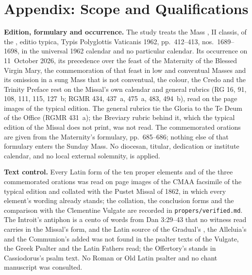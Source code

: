 \section{Appendix: Scope and Qualifications}
\label{sec:scope}

{\small
\textbf{Edition, formulary and occurrence.} The study treats the Mass
, II classis, of the , editio typica, Typis Polyglottis Vaticanis 1962, pp.~412--413,
nos.~1689--1698, in the universal 1962 calendar and no particular calendar. Its
occurrence on 11~October 2026, its precedence over the feast of the Maternity
of the Blessed Virgin Mary, the commemoration of that feast in low and
conventual Masses and its omission in a sung Mass that is not conventual, the
colour, the Credo and the Trinity Preface rest on the Missal's own calendar and
general rubrics (RG 16, 91, 108, 111, 115, 127~b; RGMR 434, 437~a, 475~a, 483,
494~b), read on the page images of the typical edition. The general rubrics tie
the Gloria to the Te Deum of the Office (RGMR 431~a); the Breviary rubric behind
it, which the typical edition of the Missal does not print, was not read. The
commemorated orations are given from the Maternity's formulary, pp.~685--686;
nothing else of that formulary enters the Sunday Mass. No diocesan, titular,
dedication or institute calendar, and no local external solemnity, is applied.

\textbf{Text control.} Every Latin form of the ten proper elements and of the
three commemorated orations was read on page images of the CMAA facsimile of
the typical edition and collated with the Pustet Missal of 1862, in which every
element's wording already stands; the collation, the conclusion forms and the
comparison with the Clementine Vulgate are recorded in
\texttt{propers/verified.md}. The Introit's antiphon is a cento of words from
Dan 3:29--43 that no witness read carries in the Missal's form, and the Latin
source of the Gradual's , the Alleluia's  and the Communion's added  was not found in the
psalter texts of the Vulgate, the Greek Psalter and the Latin Fathers read; the
Offertory's  stands in Cassiodorus's psalm
text. No Roman or Old Latin psalter and no chant manuscript was consulted.

}
